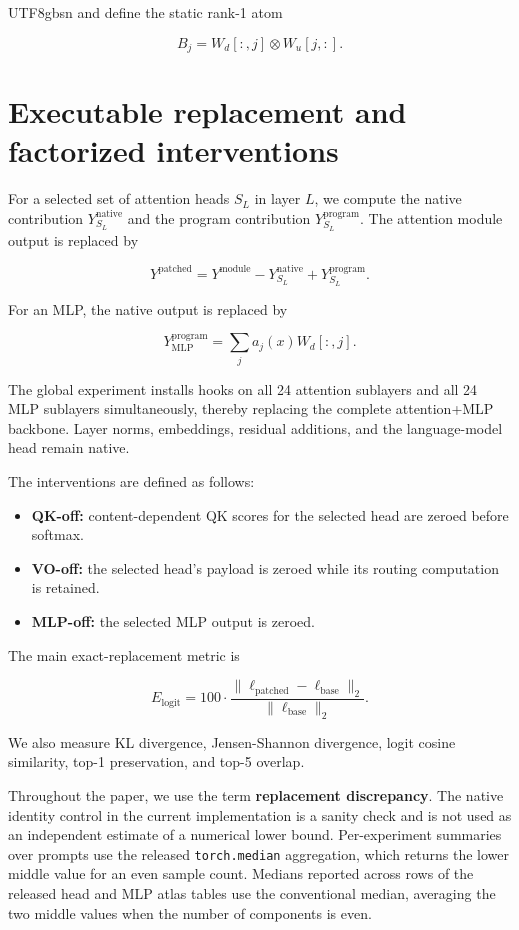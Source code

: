 \documentclass[11pt]{article}
\providecommand{\tightlist}{\setlength{\itemsep}{0pt}\setlength{\parskip}{0pt}}
\begin{document}
\begin{CJK*}{UTF8}{gbsn}
and define the static rank-1 atom

\[
B_j = W_d[:,j]\otimes W_u[j,:].
\]

\section{Executable replacement and factorized interventions}

For a selected set of attention heads \(S_L\) in layer \(L\), we compute
the native contribution \(Y^{\mathrm{native}}_{S_L}\) and the program
contribution \(Y^{\mathrm{program}}_{S_L}\). The attention module output
is replaced by

\[
Y^{\mathrm{patched}} = Y^{\mathrm{module}} - Y^{\mathrm{native}}_{S_L} + Y^{\mathrm{program}}_{S_L}.
\]

For an MLP, the native output is replaced by

\[
Y^{\mathrm{program}}_{\mathrm{MLP}} = \sum_j a_j(x)W_d[:,j].
\]

The global experiment installs hooks on all 24 attention sublayers and
all 24 MLP sublayers simultaneously, thereby replacing the complete
attention+MLP backbone. Layer norms, embeddings, residual additions, and
the language-model head remain native.

The interventions are defined as follows:

\begin{itemize}
\tightlist
\item
  \textbf{QK-off:} content-dependent QK scores for the selected head are
  zeroed before softmax.
\item
  \textbf{VO-off:} the selected head's payload is zeroed while its
  routing computation is retained.
\item
  \textbf{MLP-off:} the selected MLP output is zeroed.
\end{itemize}

The main exact-replacement metric is

\[
E_{\mathrm{logit}} = 100\cdot \frac{\|\ell_{\mathrm{patched}}-\ell_{\mathrm{base}}\|_2}{\|\ell_{\mathrm{base}}\|_2}.
\]

We also measure KL divergence, Jensen-Shannon divergence, logit cosine
similarity, top-1 preservation, and top-5 overlap.

Throughout the paper, we use the term \textbf{replacement discrepancy}.
The native identity control in the current implementation is a sanity
check and is not used as an independent estimate of a numerical lower
bound. Per-experiment summaries over prompts use the released
\texttt{torch.median} aggregation, which returns the lower middle value
for an even sample count. Medians reported across rows of the released
head and MLP atlas tables use the conventional median, averaging the two
middle values when the number of components is even.


\end{CJK*}
\end{document}
